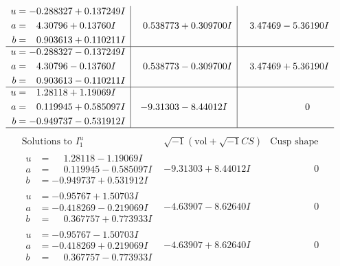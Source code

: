 \documentclass[1p]{elsarticle_modified}
\theoremstyle{definition}
\newcommand{\I}{\sqrt{-1}}
\begin{document}
$$\begin{array}{c|c|c}
\begin{aligned}
u &= -0.288327 + 0.137249 I \\
a &= \phantom{-}4.30796 + 0.13760 I \\
b &= \phantom{-}0.903613 + 0.110211 I\end{aligned}
 & \phantom{-}0.538773 + 0.309700 I & \phantom{-}3.47469 - 5.36190 I \\ \hline\begin{aligned}
u &= -0.288327 - 0.137249 I \\
a &= \phantom{-}4.30796 - 0.13760 I \\
b &= \phantom{-}0.903613 - 0.110211 I\end{aligned}
 & \phantom{-}0.538773 - 0.309700 I & \phantom{-}3.47469 + 5.36190 I \\ \hline\begin{aligned}
u &= \phantom{-}1.28118 + 1.19069 I \\
a &= \phantom{-}0.119945 + 0.585097 I \\
b &= -0.949737 - 0.531912 I\end{aligned}
 & -9.31303 - 8.44012 I & \phantom{-0.000000 } 0\\
 \hline 
 \end{array}$$\newpage$$\begin{array}{c|c|c}  
\text{Solutions to }I^u_{1}& \I (\text{vol} + \sqrt{-1}CS) & \text{Cusp shape}\\
 \hline 
\begin{aligned}
u &= \phantom{-}1.28118 - 1.19069 I \\
a &= \phantom{-}0.119945 - 0.585097 I \\
b &= -0.949737 + 0.531912 I\end{aligned}
 & -9.31303 + 8.44012 I & \phantom{-0.000000 } 0 \\ \hline\begin{aligned}
u &= -0.95767 + 1.50703 I \\
a &= -0.418269 - 0.219069 I \\
b &= \phantom{-}0.367757 + 0.773933 I\end{aligned}
 & -4.63907 - 8.62640 I & \phantom{-0.000000 } 0 \\ \hline\begin{aligned}
u &= -0.95767 - 1.50703 I \\
a &= -0.418269 + 0.219069 I \\
b &= \phantom{-}0.367757 - 0.773933 I\end{aligned}
 & -4.63907 + 8.62640 I & \phantom{-0.000000 } 0 \\ \hline\begin{aligned}

\end{aligned}
\end{array}$$
\end{document}
